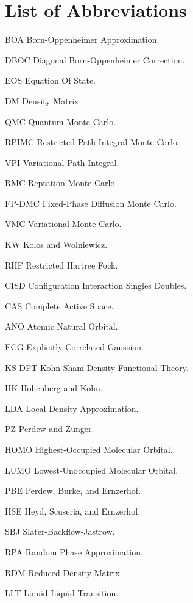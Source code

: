 \listoftables
\listoffigures

\chapter{List of Abbreviations}

\begin{symbollist*}
\item[BOA] Born-Oppenheimer Approximation.
\item[DBOC] Diagonal Born-Oppenheimer Correction.
\item[EOS] Equation Of State.
\item[DM] Density Matrix.
\item[QMC] Quantum Monte Carlo.
\item[RPIMC] Restricted Path Integral Monte Carlo.
\item[VPI] Variational Path Integral.
\item[RMC] Reptation Monte Carlo
\item[FP-DMC] Fixed-Phase Diffusion Monte Carlo.
\item[VMC] Variational Monte Carlo.
\item[KW] Kolos and Wolniewicz.
\item[RHF] Restricted Hartree Fock.
\item[CISD] Configuration Interaction Singles Doubles.
\item[CAS] Complete Active Space.
\item[ANO] Atomic Natural Orbital.
\item[ECG] Explicitly-Correlated Gaussian.
\item[KS-DFT] Kohn-Sham Density Functional Theory.
\item[HK] Hohenberg and Kohn.
\item[LDA] Local Density Approximation.
\item[PZ] Perdew and Zunger.
\item[HOMO] Highest-Occupied Molecular Orbital.
\item[LUMO] Lowest-Unoccupied Molecular Orbital.
\item[PBE] Perdew, Burke, and Ernzerhof.
\item[HSE] Heyd, Scuseria, and Ernzerhof.
\item[SBJ] Slater-Backflow-Jastrow.
\item[RPA] Random Phase Approximation.
\item[RDM] Reduced Density Matrix.
\item[LLT] Liquid-Liquid Transition.

\end{symbollist*}
